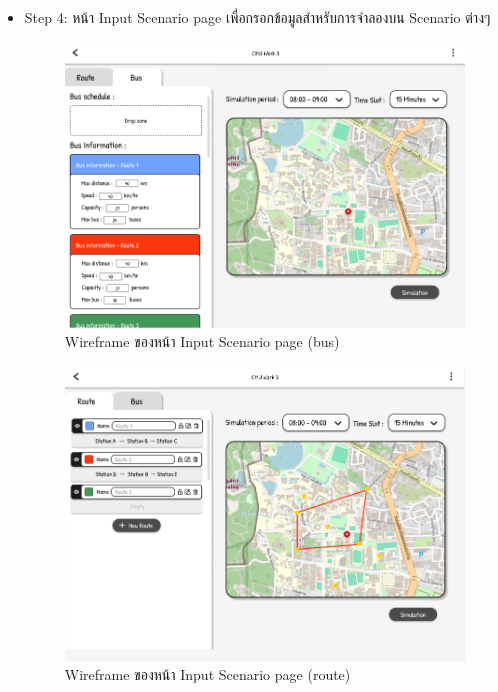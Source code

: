\begin{mypara}
\begin{itemize}
\begin{itemize}
    \end{itemize}

    \item Step 4: หน้า Input Scenario page เพื่อกรอกข้อมูลสำหรับการจำลองบน Scenario ต่างๆ
      \begin{figure}[H]
        \centering 
        \includegraphics[scale=0.4]{input_bus.png}
        \caption{Wireframe ของหน้า Input Scenario page (bus) }
        \label{fig:WireframeInputLogin}
      \end{figure}

      \begin{figure}[H]
        \centering
        \includegraphics[scale=0.4]{input_route.png}
        \caption{Wireframe ของหน้า Input Scenario page (route) }
        \label{fig:WireframeInputRouteLogin}
      \end{figure}


\end{itemize}
\end{mypara}
